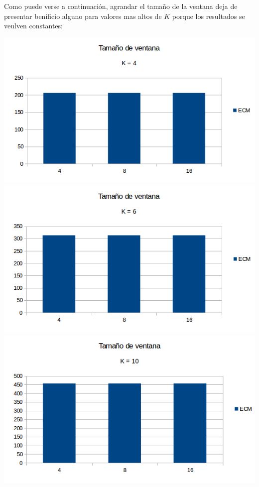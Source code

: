 Como puede verse a continuación, agrandar el tamaño de la ventana deja de presentar benificio alguno para valores mas altos de $K$ porque los resultados se veulven constantes:

\begin{center}
\includegraphics[scale=0.50]{imagenes/VK4.png}
\includegraphics[scale=0.50]{imagenes/VK6.png}
\includegraphics[scale=0.50]{imagenes/VK10.png}
\end{center}

